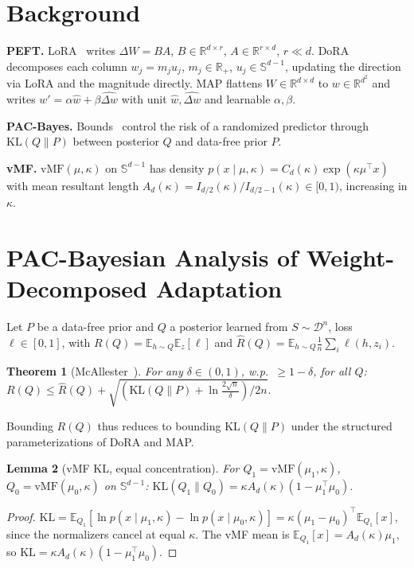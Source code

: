 \documentclass[10pt]{article}
\newtheorem{theorem}{Theorem}[section]
\newtheorem{lemma}[theorem]{Lemma}
\newcommand{\KL}{\mathrm{KL}}
\newcommand{\vMF}{\mathrm{vMF}}
\newcommand{\Ad}{A_d}
\newcommand{\Sd}{\mathbb{S}^{d-1}}
\newcommand{\E}{\mathbb{E}}
\newcommand{\R}{\mathbb{R}}
\begin{document}
\section{Background}
\textbf{PEFT.} LoRA~\cite{hu2021lora} writes $\Delta W=BA$, $B\in\R^{d\times r}$,
$A\in\R^{r\times d}$, $r\ll d$. DoRA decomposes each column $w_j=m_j u_j$,
$m_j\in\R_+$, $u_j\in\Sd$, updating the direction via LoRA and the magnitude directly.
MAP flattens $W\in\R^{d\times d}$ to $w\in\R^{d^2}$ and writes
$w'=\alpha\hat w+\beta\widehat{\Delta w}$ with unit $\hat w,\widehat{\Delta w}$ and
learnable $\alpha,\beta$.

\textbf{PAC-Bayes.} Bounds~\cite{mcallester1999pac} control the risk of a randomized
predictor through $\KL(Q\|P)$ between posterior $Q$ and data-free prior $P$.

\textbf{vMF.} $\vMF(\mu,\kappa)$ on $\Sd$ has density
$p(x\mid\mu,\kappa)=C_d(\kappa)\exp(\kappa\mu^\top x)$ with mean resultant length
$\Ad(\kappa)=I_{d/2}(\kappa)/I_{d/2-1}(\kappa)\in[0,1)$, increasing in $\kappa$.

\section{PAC-Bayesian Analysis of Weight-Decomposed Adaptation}
\label{sec:analysis}

Let $P$ be a data-free prior and $Q$ a posterior learned from $S\sim\mathcal{D}^n$,
loss $\ell\in[0,1]$, with $R(Q)=\E_{h\sim Q}\E_z[\ell]$ and
$\hat R(Q)=\E_{h\sim Q}\frac1n\sum_i\ell(h,z_i)$.

\begin{theorem}[McAllester~\cite{mcallester1999pac}]\label{thm:mcallester}
For any $\delta\in(0,1)$, w.p.\ $\ge1-\delta$, for all $Q$:
$R(Q)\le\hat R(Q)+\sqrt{(\KL(Q\|P)+\ln\tfrac{2\sqrt n}{\delta})/2n}.$
\end{theorem}
\noindent Bounding $R(Q)$ thus reduces to bounding $\KL(Q\|P)$ under the structured
parameterizations of DoRA and MAP.

\begin{lemma}[vMF KL, equal concentration]\label{lem:vmf_kl}
For $Q_1=\vMF(\mu_1,\kappa)$, $Q_0=\vMF(\mu_0,\kappa)$ on $\Sd$:
$\KL(Q_1\|Q_0)=\kappa \Ad(\kappa)(1-\mu_1^\top\mu_0).$
\end{lemma}
\begin{proof}
$\KL=\E_{Q_1}[\ln p(x\mid\mu_1,\kappa)-\ln p(x\mid\mu_0,\kappa)]=\kappa(\mu_1-\mu_0)^\top\E_{Q_1}[x]$,
since the normalizers cancel at equal $\kappa$. The vMF mean is
$\E_{Q_1}[x]=\Ad(\kappa)\mu_1$, so
$\KL=\kappa \Ad(\kappa)(1-\mu_1^\top\mu_0)$.
\end{proof}
\end{document}
